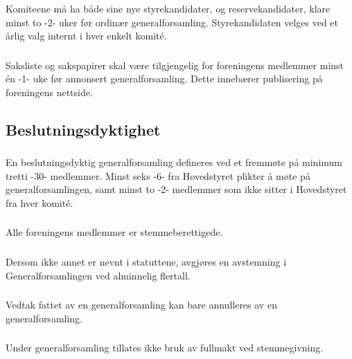 \subsubsection{}
Komiteene må ha både sine nye styrekandidater, og reservekandidater, klare minst to -2- uker før ordinær
generalforsamling. Styrekandidaten velges ved et årlig valg internt i hver enkelt komité.

\subsubsection{}
Saksliste og sakspapirer skal være tilgjengelig for foreningens medlemmer minst
én -1- uke før annonsert generalforsamling. Dette innebærer publisering på
foreningens nettside.


\subsection{Beslutningsdyktighet}
\subsubsection{}
En beslutningsdyktig generalforsamling defineres ved et fremmøte på minimum
tretti -30- medlemmer. Minst seks -6- fra Hovedstyret plikter å møte på
generalforsamlingen, samt minst to -2- medlemmer som ikke sitter i Hovedstyret
fra hver komité.

\subsubsection{}
Alle foreningens medlemmer er stemmeberettigede.

\subsubsection{}
Dersom ikke annet er nevnt i statuttene, avgjøres en avstemning i Generalforsamlingen ved
alminnelig flertall.

\subsubsection{}
Vedtak fattet av en generalforsamling kan bare annulleres av en generalforsamling.

\subsubsection{}
Under generalforsamling tillates ikke bruk av fullmakt ved stemmegivning.

